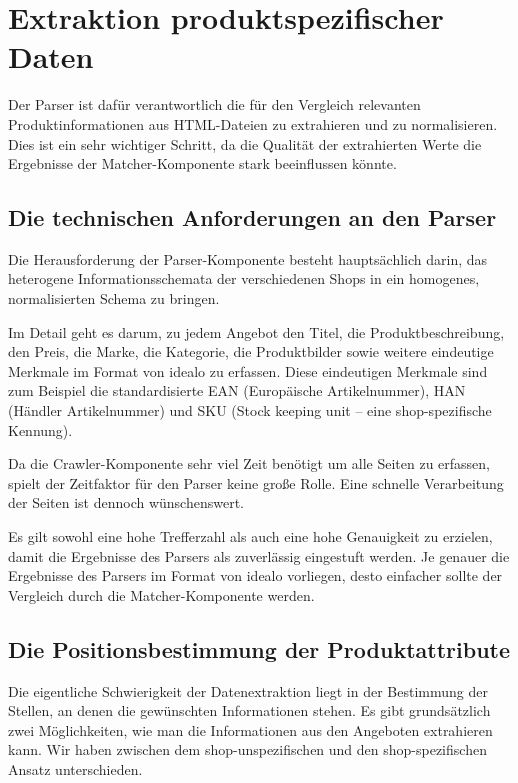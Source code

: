 \section{Extraktion produktspezifischer Daten}
\label{sec:extraktion-produktspezifischer-daten}

Der Parser ist dafür verantwortlich die für den Vergleich relevanten Produktinformationen aus HTML-Dateien zu
extrahieren und zu normalisieren.
Dies ist ein sehr wichtiger Schritt, da die Qualität der extrahierten Werte die Ergebnisse der Matcher-Komponente
stark beeinflussen könnte.

\subsection{Die technischen Anforderungen an den Parser}
\label{subsec:technische-anforderungen-parser}

Die Herausforderung der Parser-Komponente besteht hauptsächlich darin, das heterogene Informationsschemata der
verschiedenen Shops in ein homogenes, normalisierten Schema zu bringen.

Im Detail geht es darum, zu jedem Angebot den Titel, die Produktbeschreibung, den Preis, die Marke, die Kategorie,
die Produktbilder sowie weitere eindeutige Merkmale im Format von idealo zu erfassen.
Diese eindeutigen Merkmale sind zum Beispiel die standardisierte EAN (Europäische Artikelnummer), HAN (Händler
Artikelnummer) und SKU (Stock keeping unit -- eine shop-spezifische Kennung).

Da die Crawler-Komponente sehr viel Zeit benötigt um alle Seiten zu erfassen, spielt der Zeitfaktor für den Parser
keine große Rolle.
Eine schnelle Verarbeitung der Seiten ist dennoch wünschenswert.

Es gilt sowohl eine hohe Trefferzahl als auch eine hohe Genauigkeit zu erzielen, damit die  Ergebnisse des Parsers
als zuverlässig eingestuft werden.
Je genauer die Ergebnisse des Parsers im Format von idealo vorliegen, desto einfacher sollte der Vergleich durch die
Matcher-Komponente werden.

\subsection{Die Positionsbestimmung der Produktattribute}
\label{subsec:herangehensweisen}

Die eigentliche Schwierigkeit der Datenextraktion liegt in der Bestimmung der Stellen, an denen die gewünschten
Informationen stehen.
Es gibt grundsätzlich zwei Möglichkeiten, wie man die Informationen aus den Angeboten extrahieren kann.
Wir haben zwischen dem shop-unspezifischen und den shop-spezifischen Ansatz unterschieden.


